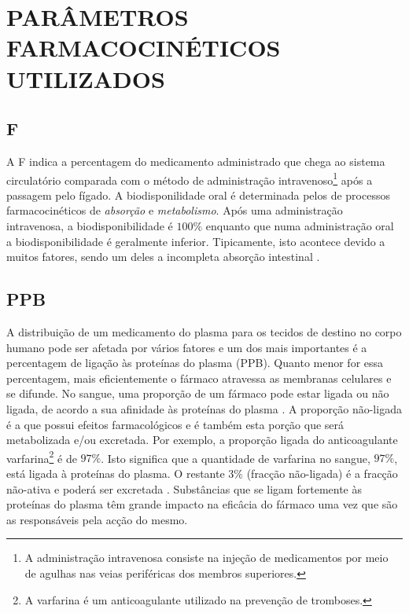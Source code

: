 \section{PARÂMETROS FARMACOCINÉTICOS UTILIZADOS}
\label{sec:3parametros}

\subsection{\ac{F}}

A \ac{F} indica a percentagem do medicamento administrado que chega ao sistema circulatório comparada com o método de 
administração intravenoso\footnote{A administração intravenosa consiste na injeção de medicamentos por meio de 
agulhas nas veias periféricas dos membros superiores.} após a passagem pelo fígado. A biodisponilidade oral é determinada pelos de 
processos farmacocinéticos de \emph{absorção} e \emph{metabolismo}. Após uma administração intravenosa, a biodisponibilidade é $100\%$ enquanto que numa 
administração oral a biodisponibilidade é geralmente inferior. Tipicamente, isto acontece devido a muitos fatores, sendo um deles a incompleta absorção 
intestinal \citep{Urso2002}.

\subsection{\ac{PPB}}

A distribuição de um medicamento do plasma para os tecidos de destino no corpo humano pode ser afetada por vários fatores e um dos mais 
importantes é a percentagem de ligação às proteínas do plasma (\ac{PPB}). Quanto menor for essa percentagem, mais eficientemente 
o fármaco atravessa as membranas celulares e se difunde. No sangue, uma proporção de um fármaco pode
estar ligada ou não ligada, de acordo a sua afinidade às proteínas do plasma \citep{shargel2005}. 
A proporção não-ligada é a que possui efeitos farmacológicos e é também esta porção que será metabolizada e/ou excretada. Por exemplo, a proporção ligada do 
anticoagulante varfarina\footnote{A varfarina é um anticoagulante utilizado na prevenção de tromboses.} é de $97\%$. Isto significa que 
a quantidade de varfarina no sangue, $97\%$, está ligada à proteínas do plasma. O restante $3\%$ (fracção não-ligada) é a fracção não-ativa e poderá ser excretada
\citep{shargel2005}. Substâncias que se ligam fortemente às proteínas do plasma têm grande impacto na eficâcia do fármaco 
uma vez que são as responsáveis pela acção do mesmo. 

